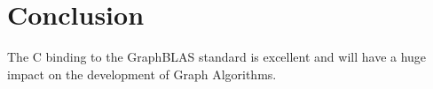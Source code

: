 \section{Conclusion}
\label{sec:conclusion}

The C binding to the GraphBLAS standard is excellent and will have a huge 
impact on the development of Graph Algorithms.

